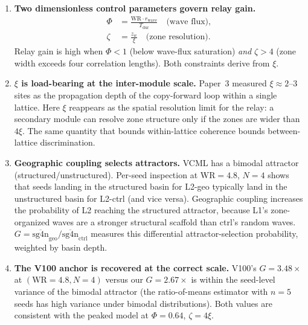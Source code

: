 \documentclass[11pt]{article}
\begin{document}
\begin{enumerate}
  \item \textbf{Two dimensionless control parameters govern relay gain.}
    \begin{align}
      \Phi &= \frac{\mathrm{WR} \cdot r_{\mathrm{wave}}}{T_{\mathrm{dur}}} \quad \text{(wave flux)}, \\
      \zeta &= \frac{z_w}{\xi} \quad \text{(zone resolution)}.
    \end{align}
    Relay gain is high when $\Phi < 1$ (below wave-flux saturation) \emph{and} $\zeta > 4$
    (zone width exceeds four correlation lengths). Both constraints derive from $\xi$.

  \item \textbf{$\xi$ is load-bearing at the inter-module scale.}
    Paper~3 measured $\xi \approx 2\text{--}3$ sites as the propagation depth of the
    copy-forward loop within a single lattice. Here $\xi$ reappears as the spatial
    resolution limit for the relay: a secondary module can resolve zone structure only if
    the zones are wider than $4\xi$. The same quantity that bounds within-lattice coherence
    bounds between-lattice discrimination.

  \item \textbf{Geographic coupling selects attractors.}
    VCML has a bimodal attractor (structured/unstructured). Per-seed inspection at
    $\mathrm{WR}=4.8$, $N=4$ shows that seeds landing in the structured basin for L2-geo
    typically land in the unstructured basin for L2-ctrl (and vice versa). Geographic
    coupling increases the probability of L2 reaching the structured attractor, because
    L1's zone-organized waves are a stronger structural scaffold than ctrl's random waves.
    $G = \overline{\mathrm{sg4n}}_{\mathrm{geo}} / \overline{\mathrm{sg4n}}_{\mathrm{ctrl}}$
    measures this differential attractor-selection probability, weighted by basin depth.

  \item \textbf{The V100 anchor is recovered at the correct scale.}
    V100's $G = 3.48\times$ at $(\mathrm{WR}=4.8, N=4)$ versus our $G = 2.67\times$
    is within the seed-level variance of the bimodal attractor (the ratio-of-means estimator
    with $n=5$ seeds has high variance under bimodal distributions).
    Both values are consistent with the peaked model at $\Phi = 0.64$, $\zeta = 4\xi$.
\end{enumerate}

\end{document}

